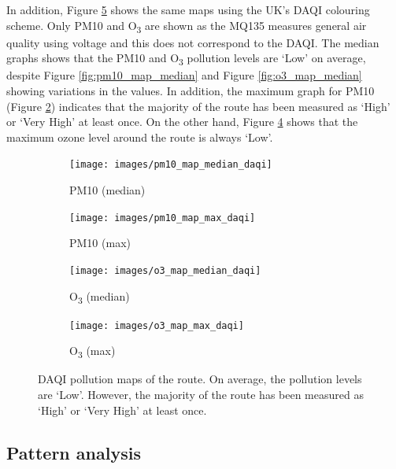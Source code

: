 \documentclass[11pt,twosided,a4paper]{report}
\begin{document}
In addition, Figure \ref{fig:daqi_maps} shows the same maps using the UK's DAQI colouring scheme. Only PM10 and O\textsubscript{3} are shown as the MQ135 measures general air quality using voltage and this does not correspond to the DAQI. The median graphs shows that the PM10 and O\textsubscript{3} pollution levels are `Low' on average, despite Figure \ref{fig:pm10_map_median} and Figure \ref{fig:o3_map_median} showing variations in the values. In addition, the maximum graph for PM10 (Figure \ref{fig:pm10_map_max_daqi}) indicates that the majority of the route has been measured as `High' or `Very High' at least once. On the other hand, Figure \ref{fig:o3_map_max_daqi} shows that the maximum ozone level around the route is always `Low'.

\begin{figure}[!tb]
    \centering
    \begin{minipage}{1\linewidth}
            \begin{subfigure}[t]{.5\linewidth}
                \texttt{[image: images/pm10\_map\_median\_daqi]}
                \caption{PM10 (median)}
                \label{fig:pm10_map_median_daqi}
            \end{subfigure}
            \begin{subfigure}[t]{.5\linewidth}
            	\texttt{[image: images/pm10\_map\_max\_daqi]}
            	\caption{PM10 (max)}
            	\label{fig:pm10_map_max_daqi}
	   \end{subfigure}
            \begin{subfigure}[t]{.5\linewidth}
                \texttt{[image: images/o3\_map\_median\_daqi]}
                \caption{O\textsubscript{3} (median)}
                \label{fig:o3_map_median_daqi}
            \end{subfigure}
            \begin{subfigure}[t]{.5\linewidth}
            	\texttt{[image: images/o3\_map\_max\_daqi]}
            	\caption{O\textsubscript{3} (max)}
            	\label{fig:o3_map_max_daqi}
	   \end{subfigure}
        \end{minipage}
    \caption[DAQI pollution maps of the route.]{DAQI pollution maps of the route. On average, the pollution levels are `Low'. However, the majority of the route has been measured as `High' or `Very High' at least once.}
    \label{fig:daqi_maps}
\end{figure}

\newpage

\subsection{Pattern analysis}
\end{document}

